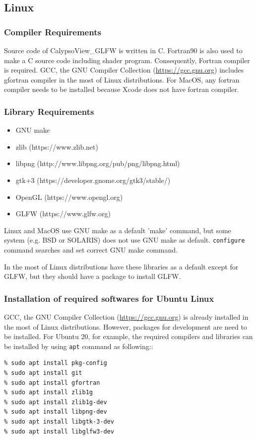 \subsection{Linux}
\subsubsection{Compiler Requirements}
Source code of CalypsoView\_GLFW is written in C. Fortran90 is also used to make a C source code including shader program. Consequently, Fortran compiler is required. GCC, the GNU Compiler Collection (\url{https://gcc.gnu.org}) includes gfortran compiler in the most of Linux distributions. For MacOS, any fortran compiler needs to be installed because Xcode does not have fortran compiler.

\subsubsection{Library Requirements}
\label{sec:requirements}
\begin{itemize}
\item GNU make
\item zlib (https://www.zlib.net)
\item libpng (http://www.libpng.org/pub/png/libpng.html)
\item gtk+3  (https://developer.gnome.org/gtk3/stable/)
\item OpenGL (https://www.opengl.org)
\item GLFW   (https://www.glfw.org)
\end{itemize}
Linux and MacOS use GNU make as a default 'make' command, but some system (e.g. BSD or SOLARIS) does not use GNU make as default. \verb|configure| command searches and set correct GNU make command.

In the most of Linux distributions have these libraries as a default except for {\color{red} GLFW}, but they should have a package to install GLFW.

\subsubsection{Installation of required softwares for Ubuntu Linux}
GCC, the GNU Compiler Collection (\url{https://gcc.gnu.org}) is already installed in the most of Linux distributions. However, packages for development are need to be installed. For Ubuntu 20, for example, the required compilers and  libraries can be installed by using \verb|apt| command as following::
%
\begin{verbatim}
% sudo apt install pkg-config
% sudo apt install git
% sudo apt install gfortran
% sudo apt install zlib1g
% sudo apt install zlib1g-dev
% sudo apt install libpng-dev
% sudo apt install libgtk-3-dev
% sudo apt install libglfw3-dev
\end{verbatim}
%


